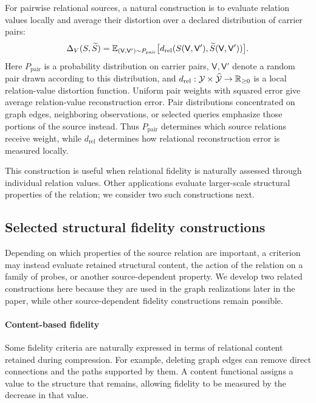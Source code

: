 For pairwise relational sources, a natural construction is to evaluate relation values locally and average their distortion over a declared distribution of carrier pairs:
\begin{equation}
\Delta_V(S,\widetilde S)
=
\mathbb{E}_{(\mathsf V,\mathsf V')\sim P_{\mathrm{pair}}}
\bigl[d_{\mathrm{rel}}(S(\mathsf V,\mathsf V'),\widetilde S(\mathsf V,\mathsf V'))\bigr].
\label{eq:pairwise-relational-fidelity}
\end{equation}
Here $P_{\mathrm{pair}}$ is a probability distribution on carrier pairs, $\mathsf V,\mathsf V'$ denote a random pair drawn according to this distribution, and $d_{\mathrm{rel}}:\mathcal Y\times\widehat{\mathcal Y}\to\mathbb{R}_{\ge0}$ is a local relation-value distortion function.
Uniform pair weights with squared error give average relation-value reconstruction error.
Pair distributions concentrated on graph edges, neighboring observations, or selected queries emphasize those portions of the source instead.
Thus $P_{\mathrm{pair}}$ determines which source relations receive weight, while $d_{\mathrm{rel}}$ determines how relational reconstruction error is measured locally.

This construction is useful when relational fidelity is naturally assessed through individual relation values.
Other applications evaluate larger-scale structural properties of the relation; we consider two such constructions next.

\subsection{Selected structural fidelity constructions}

Depending on which properties of the source relation are important, a criterion may instead evaluate retained structural content, the action of the relation on a family of probes, or another source-dependent property.
We develop two related constructions here because they are used in the graph realizations later in the paper, while other source-dependent fidelity constructions remain possible.

\paragraph{Content-based fidelity}

Some fidelity criteria are naturally expressed in terms of relational content retained during compression.
For example, deleting graph edges can remove direct connections and the paths supported by them.
A content functional assigns a value to the structure that remains, allowing fidelity to be measured by the decrease in that value.

